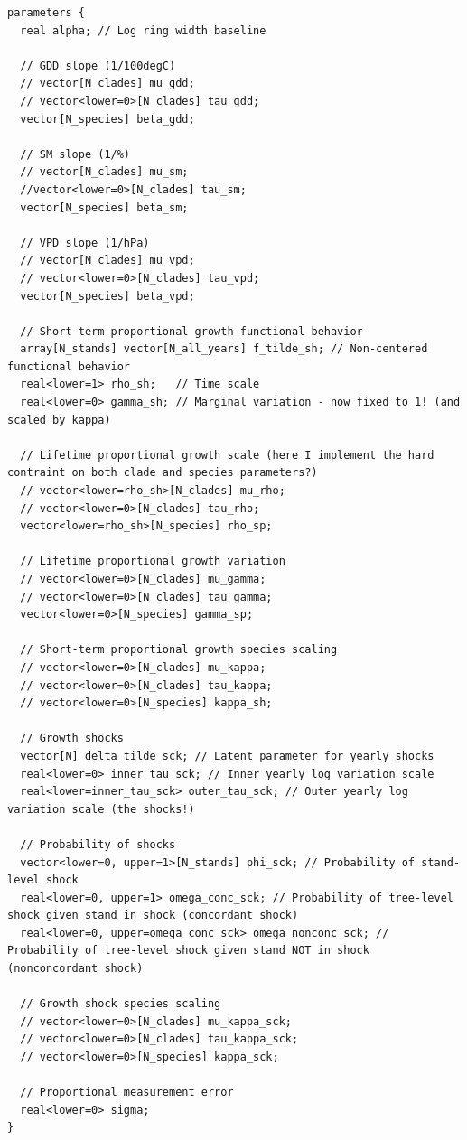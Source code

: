 \documentclass[
  letterpaper,
  DIV=11,
  numbers=noendperiod]{scrartcl}
\begin{document}
\begin{verbatim}
parameters {
  real alpha; // Log ring width baseline
  
  // GDD slope (1/100degC)
  // vector[N_clades] mu_gdd;
  // vector<lower=0>[N_clades] tau_gdd;
  vector[N_species] beta_gdd;
  
  // SM slope (1/%)
  // vector[N_clades] mu_sm;
  //vector<lower=0>[N_clades] tau_sm;
  vector[N_species] beta_sm;
  
  // VPD slope (1/hPa)
  // vector[N_clades] mu_vpd;
  // vector<lower=0>[N_clades] tau_vpd;
  vector[N_species] beta_vpd;
  
  // Short-term proportional growth functional behavior
  array[N_stands] vector[N_all_years] f_tilde_sh; // Non-centered functional behavior
  real<lower=1> rho_sh;   // Time scale
  real<lower=0> gamma_sh; // Marginal variation - now fixed to 1! (and scaled by kappa)
  
  // Lifetime proportional growth scale (here I implement the hard contraint on both clade and species parameters?)
  // vector<lower=rho_sh>[N_clades] mu_rho;
  // vector<lower=0>[N_clades] tau_rho;
  vector<lower=rho_sh>[N_species] rho_sp; 
  
  // Lifetime proportional growth variation
  // vector<lower=0>[N_clades] mu_gamma;
  // vector<lower=0>[N_clades] tau_gamma;
  vector<lower=0>[N_species] gamma_sp; 
  
  // Short-term proportional growth species scaling
  // vector<lower=0>[N_clades] mu_kappa;
  // vector<lower=0>[N_clades] tau_kappa;
  // vector<lower=0>[N_species] kappa_sh; 
  
  // Growth shocks
  vector[N] delta_tilde_sck; // Latent parameter for yearly shocks
  real<lower=0> inner_tau_sck; // Inner yearly log variation scale
  real<lower=inner_tau_sck> outer_tau_sck; // Outer yearly log variation scale (the shocks!)
  
  // Probability of shocks
  vector<lower=0, upper=1>[N_stands] phi_sck; // Probability of stand-level shock
  real<lower=0, upper=1> omega_conc_sck; // Probability of tree-level shock given stand in shock (concordant shock)
  real<lower=0, upper=omega_conc_sck> omega_nonconc_sck; // Probability of tree-level shock given stand NOT in shock (nonconcordant shock)
  
  // Growth shock species scaling
  // vector<lower=0>[N_clades] mu_kappa_sck;
  // vector<lower=0>[N_clades] tau_kappa_sck;
  // vector<lower=0>[N_species] kappa_sck; 
  
  // Proportional measurement error
  real<lower=0> sigma; 
}


\end{verbatim}
\end{document}
